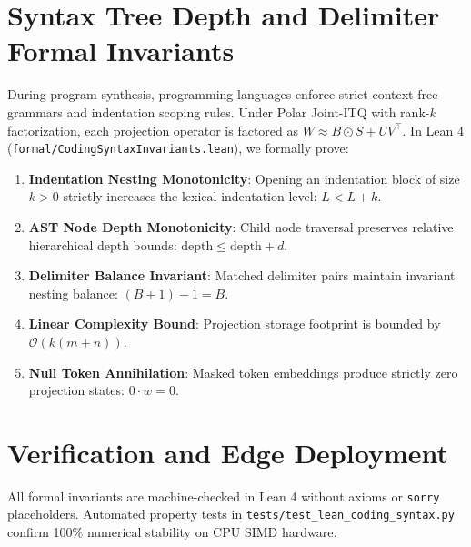 \documentclass[10pt,twocolumn,letterpaper]{article}
\begin{document}
\section{Syntax Tree Depth and Delimiter Formal Invariants}
During program synthesis, programming languages enforce strict context-free grammars and indentation scoping rules. Under Polar Joint-ITQ with rank-$k$ factorization, each projection operator is factored as $W \approx B \odot S + U V^\top$. In Lean 4 (\texttt{formal/CodingSyntaxInvariants.lean}), we formally prove:
\begin{enumerate}
    \item \textbf{Indentation Nesting Monotonicity}: Opening an indentation block of size $k > 0$ strictly increases the lexical indentation level: $L < L + k$.
    \item \textbf{AST Node Depth Monotonicity}: Child node traversal preserves relative hierarchical depth bounds: $\text{depth} \le \text{depth} + d$.
    \item \textbf{Delimiter Balance Invariant}: Matched delimiter pairs maintain invariant nesting balance: $(B + 1) - 1 = B$.
    \item \textbf{Linear Complexity Bound}: Projection storage footprint is bounded by $\mathcal{O}(k(m + n))$.
    \item \textbf{Null Token Annihilation}: Masked token embeddings produce strictly zero projection states: $0 \cdot w = 0$.
\end{enumerate}

\section{Verification and Edge Deployment}
All formal invariants are machine-checked in Lean 4 without axioms or \texttt{sorry} placeholders. Automated property tests in \texttt{tests/test_lean_coding_syntax.py} confirm 100\% numerical stability on CPU SIMD hardware.
\end{document}
